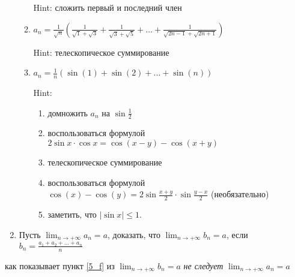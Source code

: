 \documentclass[a4paper]{article}
\begin{document}
\begin{enumerate}
\begin{enumerate}[label=\alph*)]
            Hint: сложить первый и последний член

        \item
            $a_n = \frac{1}{\sqrt{n}} \left( \frac{1}{\sqrt{1} + \sqrt{3}} + \frac{1}{\sqrt{3} + \sqrt{5}} + \dots + \frac{1}{\sqrt{2n - 1} + \sqrt{2n + 1}} \right)$

            Hint: телескопическое суммирование

        \item
            \label{5_f}
            $a_n = \frac{1}{n}\left(\sin(1) + \sin(2) + \dots + \sin(n)\right)$

            Hint:
            \begin{enumerate}[label=\arabic*)]
            \item домножить $a_n$ на $\sin \frac{1}{2}$
            \item воспользоваться формулой $2 \sin x \cdot \cos x = \cos(x - y) - \cos(x + y)$
            \item телескопическое суммирование
            \item воспользоваться формулой $\cos(x) - \cos(y) = 2 \sin \frac{x + y}{2} \cdot \sin \frac{y - x}{2}$ (необязательно)
            \item заметить, что $|\sin x| \leq 1$.
            \end{enumerate}

        \end{enumerate}

    \item
        Пусть $\lim_{n \to +\infty} a_n = a$, доказать, что $\lim_{n \to +\infty} b_n = a$, если $b_n = \frac{a_1 + a_2 + \dots + a_n}{n}$

    \end{enumerate}

    \begin{remark}
        как показывает пункт \ref{5_f} из $\lim_{n \to +\infty} b_n = a$ \textit{не следует} $\lim_{n \to +\infty} a_n = a$
    \end{remark}
\end{document}
